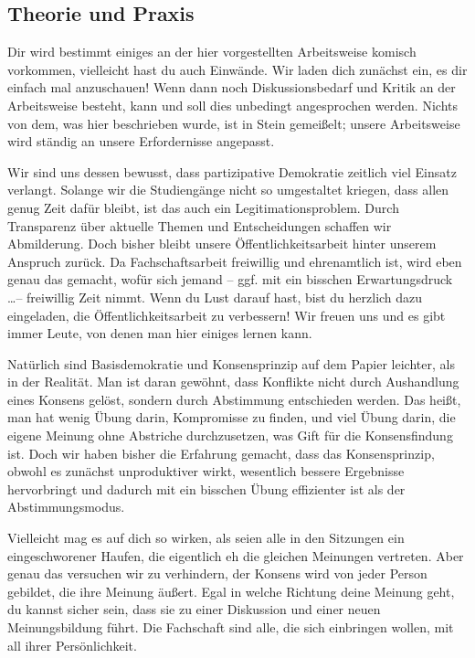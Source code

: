 \vspace{-2mm}

\subsection{Theorie und Praxis}
Dir wird bestimmt einiges an der hier vorgestellten Arbeitsweise komisch vorkommen, vielleicht hast du auch Einwände. Wir laden dich zunächst ein, es dir einfach mal anzuschauen! Wenn dann noch Diskussionsbedarf und Kritik an der Arbeitsweise besteht, kann und soll dies unbedingt angesprochen werden. Nichts von dem, was hier beschrieben wurde, ist in Stein gemeißelt; unsere Arbeitsweise wird ständig an unsere Erfordernisse angepasst.

Wir sind uns dessen bewusst, dass partizipative Demokratie zeitlich viel Einsatz verlangt. Solange wir die Studiengänge nicht so umgestaltet kriegen, dass allen genug Zeit dafür bleibt, ist das auch ein Legitimationsproblem. Durch Transparenz über aktuelle Themen und Entscheidungen schaffen wir Abmilderung. Doch bisher bleibt unsere Öffentlichkeitsarbeit hinter unserem Anspruch zurück. Da Fachschaftsarbeit freiwillig und ehrenamtlich ist, wird eben genau das gemacht, wofür sich jemand -- ggf. mit ein bisschen Erwartungsdruck \dots -- freiwillig Zeit nimmt. Wenn du Lust darauf hast, bist du herzlich dazu eingeladen, die Öffentlichkeitsarbeit zu verbessern! Wir freuen uns und es gibt immer Leute, von denen man hier einiges lernen kann.

Natürlich sind Basisdemokratie und Kon\-sens\-prinzip auf dem Papier leichter, als in der Realität. Man ist daran gewöhnt, dass Konflikte nicht durch Aushandlung eines Konsens gelöst, sondern durch Abstimmung entschieden werden. Das heißt, man hat wenig Übung darin, Kompromisse zu finden, und viel Übung darin, die eigene Meinung ohne Abstriche durchzusetzen, was Gift für die Konsensfindung ist. Doch wir haben bisher die Erfahrung gemacht, dass das Konsensprinzip, obwohl es zunächst unproduktiver wirkt, wesentlich bessere Ergebnisse hervorbringt und dadurch mit ein bisschen Übung effizienter ist als der Abstimmungsmodus.

Vielleicht mag es auf dich so wirken, als seien alle in den Sitzungen ein eingeschworener Haufen, die eigentlich eh die gleichen Meinungen vertreten. Aber genau das versuchen wir zu verhindern, der Konsens wird von jeder Person gebildet, die ihre Meinung äußert. Egal in welche Richtung deine Meinung geht, du kannst sicher sein, dass sie zu einer Diskussion und einer neuen Meinungsbildung führt. Die Fachschaft sind alle, die sich einbringen wollen, mit all ihrer Persönlichkeit.

